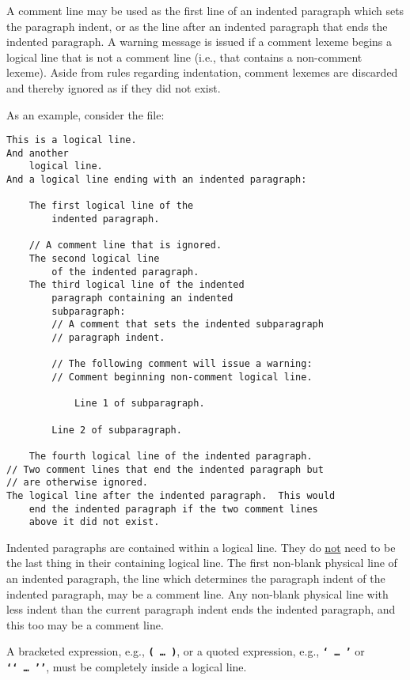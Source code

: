 \documentclass[12pt]{article}
\newcommand{\TT}[1]{{\tt \bfseries #1}}
\newenvironment{indpar}[1][0.3in]%
	{\begin{list}{}%
		     {\setlength{\itemsep}{0in}%
		      \setlength{\topsep}{0in}%
		      \setlength{\parsep}{1ex}%
		      \setlength{\labelwidth}{#1}%
		      \setlength{\leftmargin}{#1}%
		      \addtolength{\leftmargin}{\labelsep}}%
	 \item}%
	{\end{list}}
\begin{document}
A comment
line may be used as the first line of an indented paragraph which sets
the paragraph indent, or as the line after an indented paragraph that
ends the indented paragraph.
A warning message is issued if a comment lexeme begins a logical
line that is not a comment line (i.e., that contains a non-comment
lexeme).
Aside from rules regarding indentation,
comment lexemes are discarded and thereby ignored as if they did not exist.


As an example, consider the file:

\begin{indpar}\begin{verbatim}
This is a logical line.
And another
    logical line.
And a logical line ending with an indented paragraph:

    The first logical line of the
        indented paragraph.

    // A comment line that is ignored.
    The second logical line
        of the indented paragraph.
    The third logical line of the indented
        paragraph containing an indented
        subparagraph:
        // A comment that sets the indented subparagraph
        // paragraph indent.

        // The following comment will issue a warning:
        // Comment beginning non-comment logical line.

            Line 1 of subparagraph.

        Line 2 of subparagraph.

    The fourth logical line of the indented paragraph.
// Two comment lines that end the indented paragraph but
// are otherwise ignored.
The logical line after the indented paragraph.  This would
    end the indented paragraph if the two comment lines
    above it did not exist.
\end{verbatim}\end{indpar}

Indented paragraphs are contained within a logical line.  They do
\underline{not} need to be the last thing in their containing logical line.
The first non-blank physical line of an indented paragraph, the line
which determines the paragraph indent of the indented paragraph, may
be a comment line.  Any non-blank physical line with less indent than
the current paragraph indent ends the indented paragraph, and this
too may be a comment line.

A bracketed expression, e.g., \TT{(~\ldots~)}, or a quoted expression,
e.g., \TT{`~\ldots~'} or \TT{`{}`~\ldots~'{}'},
must be completely inside a logical line.
\end{document}
